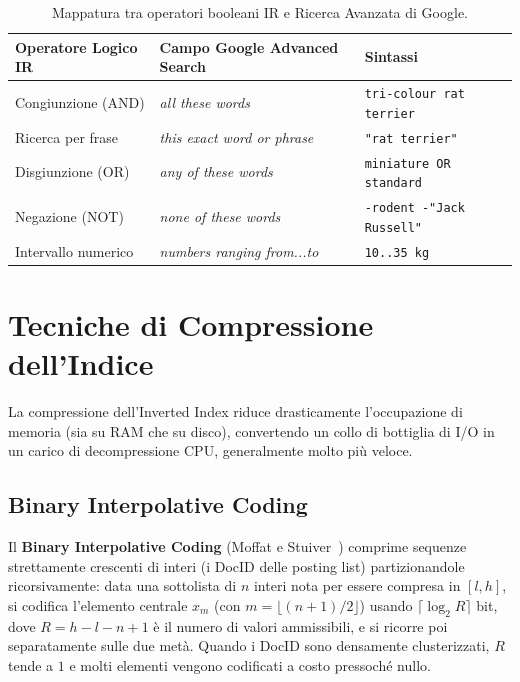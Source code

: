 \begin{table}[H]
\centering
\small
\begin{tabularx}{\textwidth}{>{\raggedright\arraybackslash}p{3.2cm} >{\raggedright\arraybackslash}p{3.8cm} >{\raggedright\arraybackslash}X}
\toprule
\textbf{Operatore Logico IR} & \textbf{Campo Google Advanced Search} & \textbf{Sintassi} \\
\midrule
Congiunzione (AND) & \textit{all these words} & \texttt{tri-colour rat terrier} \\
Ricerca per frase & \textit{this exact word or phrase} & \texttt{"rat terrier"} \\
Disgiunzione (OR) & \textit{any of these words} & \texttt{miniature OR standard} \\
Negazione (NOT) & \textit{none of these words} & \texttt{-rodent -"Jack Russell"} \\
Intervallo numerico & \textit{numbers ranging from...to} & \texttt{10..35 kg} \\
\bottomrule
\end{tabularx}
\caption{Mappatura tra operatori booleani IR e Ricerca Avanzata di Google.}
\label{tab:google-advanced-search}
\end{table}

\FloatBarrier
\section{Tecniche di Compressione dell'Indice}
\label{sec:compressione-indice-intro}

La compressione dell'Inverted Index riduce drasticamente l'occupazione di memoria (sia su RAM che su disco), convertendo un collo di bottiglia di I/O in un carico di decompressione CPU, generalmente molto pi\`u veloce.

\subsection{Binary Interpolative Coding}
Il \textbf{Binary Interpolative Coding} (Moffat e Stuiver~\cite{moffat2000}) comprime sequenze strettamente crescenti di interi (i DocID delle posting list) partizionandole ricorsivamente: data una sottolista di $n$ interi nota per essere compresa in $[l, h]$, si codifica l'elemento centrale $x_m$ (con $m = \lfloor (n+1)/2 \rfloor$) usando $\lceil \log_2 R \rceil$ bit, dove $R = h - l - n + 1$ \`e il numero di valori ammissibili, e si ricorre poi separatamente sulle due met\`a. Quando i DocID sono densamente clusterizzati, $R$ tende a $1$ e molti elementi vengono codificati a costo pressoch\'e nullo.

